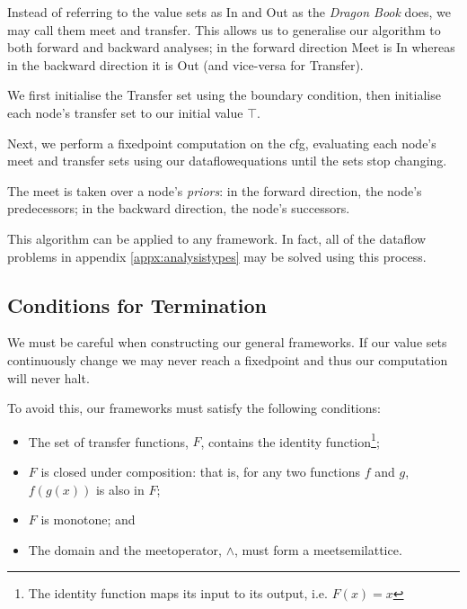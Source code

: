 \documentclass[bsc,twoside,singlespacing,parskip,logo,notimes,normalheadings]{infthesis}
\begin{document}
        Instead of referring to the value sets as In and Out as the
        {\em Dragon Book} does, we may call them \Gls{meet} and
        \Gls{transfer}. This allows us to generalise our algorithm to
        both forward and backward analyses; in the forward direction
        Meet is In whereas in the backward direction it is Out (and
        vice-versa for Transfer).
        
        We first initialise the Transfer set using the boundary
        condition, then initialise each node's transfer set to our
        initial value $\top$.
        
        Next, we perform a \gls{fixedpoint} computation on the
        \gls{cfg}, evaluating each node's \Gls{meet} and
        \Gls{transfer} sets using our \gls{dataflowequations} until
        the sets stop changing.

        The \gls{meet} is taken over a node's {\em priors}: in the
        forward direction, the node's predecessors; in the backward
        direction, the node's successors.

        This algorithm can be applied to any framework. In fact, all
        of the \gls{dataflow} problems in appendix
        \ref{appx:analysistypes} may be solved using this process.

        \subsection{Conditions for Termination}
          
        We must be careful when constructing our general
        frameworks. If our value sets continuously change we may never
        reach a \gls{fixedpoint} and thus our computation will never
        halt.

        To avoid this, our frameworks must satisfy the following
        conditions\cite[p. 684]{dragonbook}:

        \begin{itemize}
        \item The set of \gls{transfer} functions, $F$, contains
          the identity function\footnote{The identity function maps
            its input to its output, i.e. $F(x)=x$};
        \item $F$ is closed under composition: that is, for any two
          functions $f$ and $g$, $f(g(x))$ is also in $F$;
        \item $F$ is monotone; and
        \item The \gls{domain} and the \gls{meetoperator}, $\land$, must
          form a \gls{meetsemilattice}.
        \end{itemize}
\end{document}
